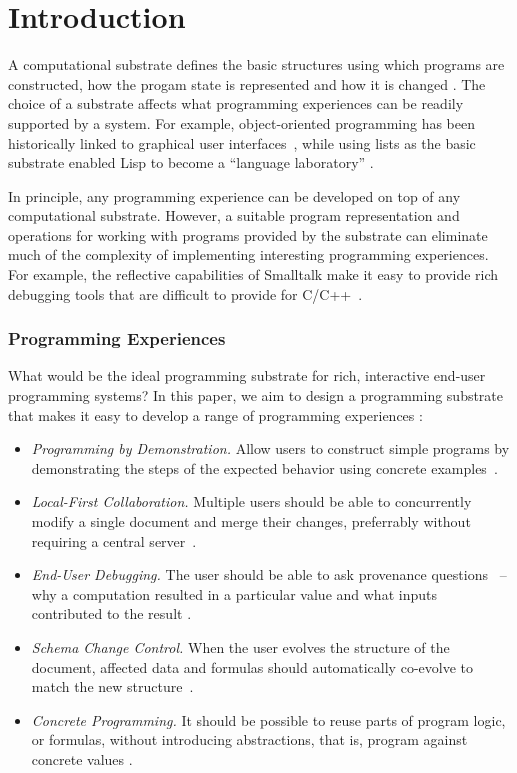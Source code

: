 \documentclass[sigconf,anonymous,screen]{acmart}
\begin{document}
\section{Introduction}

A computational substrate defines the basic structures using which programs are constructed, how
the progam state is represented and how it is changed \cite{jakubovic-2022-ladder}. The choice of
a substrate affects what programming experiences can be readily supported by a system. For example,
object-oriented programming has been historically linked to graphical user
interfaces~\cite{kay-1993-smalltalk}, while using lists as the basic substrate enabled Lisp to become
a ``language laboratory'' \cite{steele-1993-lisp}.

In principle, any programming experience can be developed on top of any computational
substrate. However, a suitable program representation and operations for working with programs
provided by the substrate can eliminate much of the complexity of implementing interesting
programming experiences. For example, the reflective capabilities of Smalltalk make it easy
to provide rich debugging tools \cite{rauch-2019-babylonian} that are difficult to provide
for C/C++~\cite{kell-2018-unix,kell-2024-debugging}.

\subsubsection*{Programming Experiences}

What would be the ideal programming substrate for rich, interactive end-user programming systems?
In this paper, we aim to design a programming substrate that makes it easy to develop a range of
programming experiences \cite{myers-2006-eup}:

\begin{itemize}
\item \emph{Programming by Demonstration.} Allow users to construct simple programs by
  demonstrating the steps of the expected behavior using concrete examples~\cite{leiva-2021-rapido,cypher-1993-pbd}.
\item \emph{Local-First Collaboration.} Multiple users should be able to concurrently
  modify a single document and merge their changes, preferrably without requiring a central server~\cite{kleppmann-2019-local,litt-2022-peritext}.
\item \emph{End-User Debugging.} The user should be able to ask provenance questions~\cite{cheney-2009-provenance} --
  why a computation resulted in a particular value and what inputs contributed to the result \cite{ko-2009-whyline}.
\item \emph{Schema Change Control.} When the user evolves the structure of the document, affected
  data and formulas should automatically co-evolve to match the new structure~\cite{litt-2020-cambria,edwards-2025-schema}.
\item \emph{Concrete Programming.} It should be possible to reuse parts of program logic, or formulas,
  without introducing abstractions, that is, program against concrete values \cite{edwards-2006-copypaste,edwards-2022-copypaste}.
\end{itemize}
\end{document}
